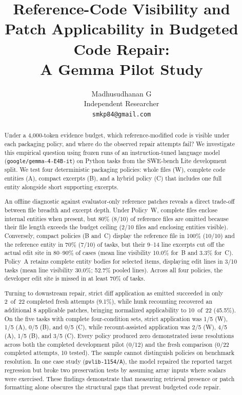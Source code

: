 \documentclass[11pt]{article}
\title{Reference-Code Visibility and Patch Applicability in Budgeted Code Repair:\\[4pt]
A Gemma Pilot Study}
\author{Madhusudhanan G\\
Independent Researcher\\
\nolinkurl{smkp84@gmail.com}}
\date{}
\begin{document}
\maketitle

\begin{abstract}
Under a 4{,}000-token evidence budget, which reference-modified code is
visible under each packaging policy, and where do the observed repair
attempts fail?  We investigate this empirical question using frozen runs
of an instruction-tuned language model (\nolinkurl{google/gemma-4-E4B-it})
on Python tasks from the SWE-bench Lite development split.  We test four
deterministic packaging policies: whole files (W), complete code
entities (A), compact excerpts (B), and a hybrid policy (C) that includes
one full entity alongside short supporting excerpts.

An offline diagnostic against evaluator-only reference patches reveals a
direct trade-off between file breadth and excerpt depth.  Under Policy~W,
complete files enclose internal entities when present, but 80\% (8/10) of
reference files are omitted because their file length exceeds the budget
ceiling (2/10 files and enclosing entities visible).  Conversely, compact
policies (B and~C) display the reference file in 100\% (10/10) and the
reference entity in 70\% (7/10) of tasks, but their 9--14 line excerpts
cut off the actual edit site in 80--90\% of cases (mean line visibility
10.0\% for~B and 3.3\% for~C).  Policy~A retains complete entity bodies
for selected items, displaying edit lines in 3/10 tasks (mean line visibility
30.0\%; 52.7\% pooled lines).  Across all four policies, the developer edit
site is missed in at least 70\% of tasks.

Turning to downstream repair, strict diff application as emitted succeeded in
only 2~of~22 completed fresh attempts (9.1\%), while hunk recounting recovered
an additional 8 applicable patches, bringing normalized applicability to
10~of~22 (45.5\%).  On the five tasks with complete four-condition sets,
strict application was 1/5 (W), 1/5 (A), 0/5 (B), and 0/5 (C), while
recount-assisted application was 2/5 (W), 4/5 (A), 1/5 (B), and 3/5 (C).
Every policy produced zero demonstrated issue resolutions across both the
completed development pilot (0/12) and the fresh comparison (0/22 completed
attempts, 10 tested).  The sample cannot distinguish policies on benchmark
resolution.  In one case study (\texttt{pvlib-1154/A}), the model repaired
the reported target regression but broke two preservation tests by assuming
array inputs where scalars were exercised.  These findings demonstrate that
measuring retrieval presence or patch formatting alone obscures the
structural gaps that prevent budgeted code repair.
\end{abstract}
\end{document}
